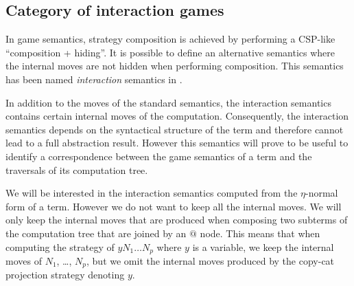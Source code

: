 \subsection{Category of interaction games}

In game semantics, strategy composition is achieved by performing a CSP-like ``composition + hiding''.
It is possible to define an alternative semantics where the internal moves are not hidden when performing composition.
This semantics has been named \emph{interaction} semantics in \cite{DBLP:conf/sas/DimovskiGL05}.

In addition to the moves of the standard semantics, the interaction semantics contains certain
internal moves of the computation.
Consequently, the interaction semantics depends on the syntactical structure of the term and therefore cannot
lead to a full abstraction result. However this semantics will prove to be useful to identify
a correspondence between the game semantics
of a term and the traversals of its computation tree.

We will be interested in the interaction semantics computed from the
$\eta$-normal form of a term. However we do not want to keep all the internal moves. We will only keep the internal
moves that are produced when composing two subterms of the computation tree that are joined by an $@$ node.
This means that when computing the strategy of
$y N_1 \ldots N_p$ where $y$ is a variable, we keep the internal moves of $N_1$, \ldots, $N_p$, but
we omit the internal moves produced by the copy-cat projection strategy denoting $y$.

